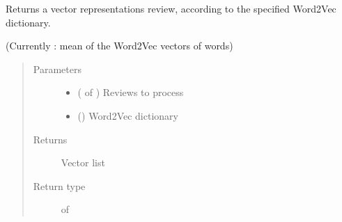 \documentclass[letterpaper,10pt,english]{sphinxmanual}
\begin{document}
\begin{fulllineitems}
\label{\detokenize{learning:loacore.learning.word2vec.review_2_vec}}
Returns a vector representations review, according to the specified Word2Vec dictionary.

(Currently : mean of the Word2Vec vectors of words)
\begin{quote}\begin{description}
\item[{Parameters}] \leavevmode\begin{itemize}
\item {} 
 ( of {\hyperref[\detokenize{classes:loacore.classes.classes.Review}]{}}) \textendash{} Reviews to process

\item {} 
 () \textendash{} Word2Vec dictionary

\end{itemize}

\item[{Returns}] \leavevmode
Vector list

\item[{Return type}] \leavevmode
{} of 

\end{description}\end{quote}

\end{fulllineitems}

\end{document}
